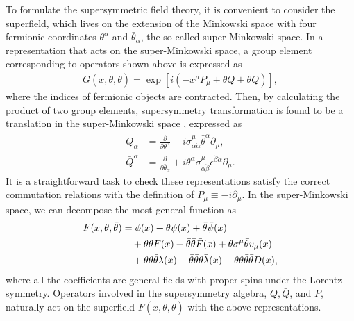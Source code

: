 \documentclass[12pt,twoside,book]{article}
\begin{document}
To formulate the supersymmetric field theory, it is convenient to consider the superfield, which lives on the extension of the Minkowski space with four fermionic coordinates $\theta^\alpha$ and $\bar{\theta}_{\dot{\alpha}}$, the so-called super-Minkowski space.
In a representation that acts on the super-Minkowski space, a group element corresponding to operators shown above is expressed as
\begin{align}
 G(x,\theta,\bar{\theta}) = \exp \left[ i \left( -x^\mu P_\mu + \theta Q + \bar{\theta} \bar{Q} \right) \right],
\end{align}
where the indices of fermionic objects are contracted.
Then, by calculating the product of two group elements, supersymmetry transformation is found to be a translation in the super-Minkowski space \cite{Salam:1981xd, Ferrara:1974ac}, expressed as
\begin{align}
  Q_\alpha &= \frac{\partial}{\partial \theta^\alpha} - i\sigma_{\alpha
  \dot{\alpha}}^\mu \bar{\theta}^{\dot{\alpha}} \partial_\mu,\label{Qrep} \\
  \bar{Q}^{\dot{\alpha}} &= \frac{\partial}{\partial \bar{\theta}_{\dot{\alpha}}}
  + i\theta^\alpha \sigma_{\alpha\dot{\beta}}^\mu \epsilon^{\dot{\beta} \dot{\alpha}}
  \partial_\mu.
\end{align}
It is a straightforward task to check these representations satisfy the correct commutation relations with the definition of $P_\mu \equiv -i\partial_\mu$.
In the super-Minkowski space, we can decompose the most general function as
\begin{align}
  F(x,\theta,\bar{\theta}) &= \phi(x) + \theta \psi(x) + \bar{\theta} \bar{\psi}(x)
  \notag \\
  &\quad + \theta\theta F(x) + \bar{\theta}\bar{\theta} \bar{F}(x)
  + \theta \sigma^\mu \bar{\theta} v_\mu (x) \notag \\
  &\quad + \theta\theta\bar{\theta} \lambda(x) + \bar{\theta}\bar{\theta}\theta \bar{\lambda}(x) + \theta\theta\bar{\theta}\bar{\theta} D(x),
\end{align}
where all the coefficients are general fields with proper spins under the Lorentz symmetry.
Operators involved in the supersymmetry algebra, $Q,\bar{Q}$, and $P$, naturally act on the superfield $F(x,\theta,\bar{\theta})$ with the above representations.
\end{document}

